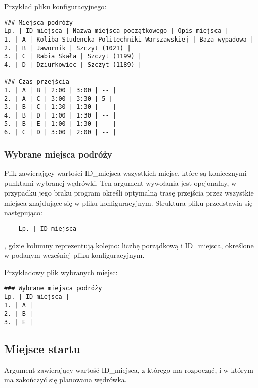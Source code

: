 \documentclass{article}
\begin{document}
Przykład pliku konfiguracyjnego:
\begin{verbatim}
### Miejsca podróży
Lp. | ID_miejsca | Nazwa miejsca początkowego | Opis miejsca |
1. | A | Koliba Studencka Politechniki Warszawskiej | Baza wypadowa |
2. | B | Jawornik | Szczyt (1021) |
3. | C | Rabia Skała | Szczyt (1199) |
4. | D | Dziurkowiec | Szczyt (1189) |

### Czas przejścia
1. | A | B | 2:00 | 3:00 | -- |
2. | A | C | 3:00 | 3:30 | 5 |
3. | B | C | 1:30 | 1:30 | -- |
4. | B | D | 1:00 | 1:30 | -- |
5. | B | E | 1:00 | 1:30 | -- |
6. | C | D | 3:00 | 2:00 | -- |
\end{verbatim}

\subsubsection{Wybrane miejsca podróży}
Plik zawierający wartości ID\_miejsca wszystkich miejsc, które są koniecznymi punktami wybranej wędrówki. Ten argument wywołania jest opcjonalny, w przypadku jego braku program określi optymalną trasę przejścia przez wszystkie miejsca znajdujące się w pliku konfiguracyjnym. Struktura pliku przedstawia się następująco: 
\newline \newline
\begin{verbatim}
    Lp. | ID_miejsca
\end{verbatim}
\noindent, gdzie kolumny reprezentują kolejno: liczbę porządkową i ID\_miejsca, określone w podanym wcześniej pliku konfiguracyjnym. 
\vspace{5pt}

Przykładowy plik wybranych miejsc:
\begin{verbatim}
### Wybrane miejsca podróży
Lp. | ID_miejsca |
1. | A |
2. | B |
3. | E |
\end{verbatim}


\subsection{Miejsce startu}
Argument zawierający wartość ID\_miejsca, z którego ma rozpocząć, i w którym ma zakończyć się planowana wędrówka.
\end{document}
